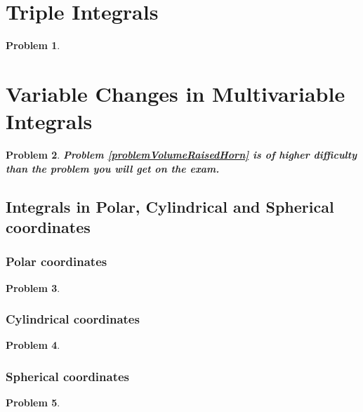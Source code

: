 \documentclass{article}
\newtheorem{problem}{Problem}
\begin{document}
\section{Triple Integrals}
\begin{problem}

\end{problem}


\section{Variable Changes in Multivariable Integrals}
\begin{problem}
\textbf{Problem \ref{problemVolumeRaisedHorn} is of higher difficulty than the problem you will get on the exam.}


\end{problem}

\subsection{Integrals in Polar, Cylindrical and Spherical coordinates}
\subsubsection{Polar coordinates}
\begin{problem}

\end{problem}
\subsubsection{Cylindrical coordinates}
\begin{problem}

\end{problem}
\subsubsection{Spherical coordinates}
\begin{problem}

\end{problem}
\end{document}
